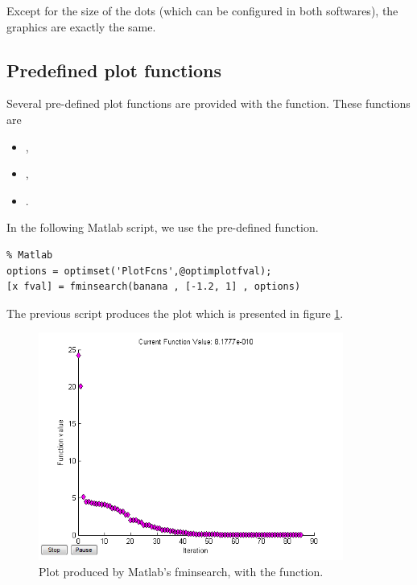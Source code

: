 Except for the size of the dots (which can be configured in 
both softwares), the graphics are exactly the same.

\subsection{Predefined plot functions}

Several pre-defined plot functions are provided with 
the  function.
These functions are 
\begin{itemize}
\item {},
\item {},
\item {}.
\end{itemize}

In the following Matlab script, we use the 
pre-defined function.

\lstset{language=matlabscript}
\begin{lstlisting}
% Matlab
options = optimset('PlotFcns',@optimplotfval);
[x fval] = fminsearch(banana , [-1.2, 1] , options)
\end{lstlisting}

The previous script produces the plot which is presented in figure 
\ref{fig-fminsearch-matlab-optimplotfval}.

\begin{figure}
\begin{center}
\includegraphics[width=10cm]{testFminsearchOptimplotfvalMatlab.png}
\end{center}
\caption{Plot produced by Matlab's fminsearch, with the  function.}
\label{fig-fminsearch-matlab-optimplotfval}
\end{figure}

